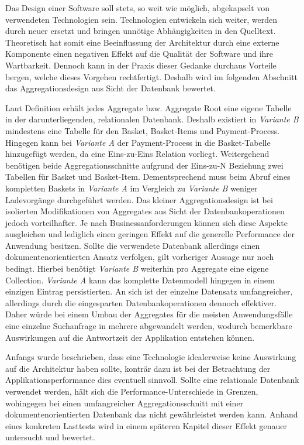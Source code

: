 Das Design einer Software soll stets, so weit wie möglich, abgekapselt von verwendeten Technologien sein. Technologien entwickeln sich weiter, werden durch neuer ersetzt und bringen unnötige Abhängigkeiten in den Quelltext. Theoretisch hat somit eine Beeinflussung der Architektur durch eine externe Komponente einen negativen Effekt auf die Qualität der Software und ihre Wartbarkeit. Dennoch kann in der Praxis dieser Gedanke durchaus Vorteile bergen, welche dieses Vorgehen rechtfertigt. Deshalb wird im folgenden Abschnitt das Aggregationsdesign aus Sicht der Datenbank bewertet.

Laut Definition erhält jedes Aggregate bzw. Aggregate Root eine eigene Tabelle in der darunterliegenden, relationalen Datenbank. Deshalb existiert in \emph{Variante B} mindestens eine Tabelle für den Basket, Basket-Items und Payment-Process. Hingegen kann bei \emph{Variante A} der Payment-Process in die Basket-Tabelle hinzugefügt werden, da eine Eins-zu-Eins Relation vorliegt. Weitergehend benötigen beide Aggregationsschnitte aufgrund der Eins-zu-N Beziehung zwei Tabellen für Basket und Basket-Item. Dementsprechend muss beim Abruf eines kompletten Baskets in \emph{Variante A} im Vergleich zu \emph{Variante B} weniger Ladevorgänge durchgeführt werden. Das kleiner Aggregationsdesign ist bei isolierten Modifikationen von Aggregates aus Sicht der Datenbankoperationen jedoch vorteilhafter. Je nach Businessanforderungen können sich diese Aspekte ausgleichen und lediglich einen geringen Effekt auf die generelle Performance der Anwendung besitzen. Sollte die verwendete Datenbank allerdings einen dokumentenorientierten Ansatz verfolgen, gilt vorheriger Aussage nur noch bedingt. Hierbei benötigt \emph{Variante B} weiterhin pro Aggregate eine eigene \gls{Collection}. \emph{Variante A} kann das komplette Datenmodell hingegen in einem einzigen Eintrag persistierten. An sich ist der einzelne Datensatz umfangreicher, allerdings durch die eingesparten Datenbankoperationen dennoch effektiver. Daher würde bei einem Umbau der Aggregates für die meisten Anwendungsfälle eine einzelne Suchanfrage in mehrere abgewandelt werden, wodurch bemerkbare Auswirkungen auf die Antwortzeit der Applikation entstehen können. 

Anfangs wurde beschrieben, dass eine Technologie idealerweise keine Auswirkung auf die Architektur haben sollte, konträr dazu ist bei der Betrachtung der Applikationsperformance dies eventuell sinnvoll. Sollte eine relationale Datenbank verwendet werden, hält sich die Performance-Unterschiede in Grenzen, wohingegen bei einen umfangreicher Aggregationsschnitt mit einer dokumentenorientierten Datenbank das nicht gewährleistet werden kann. Anhand eines konkreten Lasttests wird in einem späteren Kapitel dieser Effekt genauer untersucht und bewertet.

